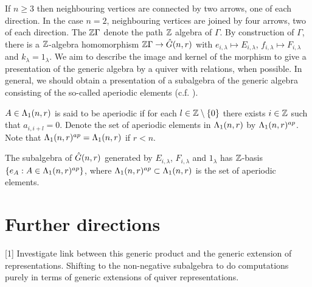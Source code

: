 \documentclass[a4paper, 11pt]{report}
\begin{document}
If $n\geq 3$ then neighbouring vertices are connected by two arrows, one of each direction. In the case $n=2$, neighbouring vertices are joined by four arrows, two of each direction. The $\mathbb{Z}\Gamma$ denote the path $\mathbb{Z}$ algebra of $\Gamma$. By construction of $\Gamma$, there is a $\mathbb{Z}$-algebra homomorphism $\mathbb{Z}\Gamma\to\hat{G}(n,r)$ with $e_{i,\lambda}\mapsto E_{i,\lambda}$, $f_{i,\lambda}\mapsto F_{i,\lambda}$ and $k_\lambda = 1_\lambda$. We aim to describe the image and kernel of the morphism to give a presentation of the generic algebra by a quiver with relations, when possible. In general, we should obtain a presentation of a subalgebra of the generic algebra consisting of the so-called aperiodic elements (c.f. \cite{lusztig99}).


$A\in\Lambda_1(n,r)$ is said to be aperiodic if for each $l\in\mathbb{Z}\setminus\{0\}$ there exists $i\in\mathbb{Z}$ such that $a_{i,i+l}=0$. Denote the set of aperiodic elements in $\Lambda_1(n,r)$ by $\Lambda_1(n,r)^{ap}$. Note that $\Lambda_1(n,r)^{ap}=\Lambda_1(n,r)$ if $r<n$.


\begin{proposition}
The subalgebra of $\hat{G}(n,r)$ generated by $E_{i,\lambda}$, $F_{i,\lambda}$ and $1_\lambda$ has $\mathbb{Z}$-basis $\{e_A:A\in\Lambda_1(n,r)^{ap}\}$, where $\Lambda_1(n,r)^{ap}\subset\Lambda_1(n,r)$ is the set of aperiodic elements.
\end{proposition}







\chapter{Further directions}

[1] Investigate link between this generic product and the generic extension of representations. Shifting to the non-negative subalgebra to do computations purely in terms of generic extensions of quiver representations.




\printbibliography
\end{document}
